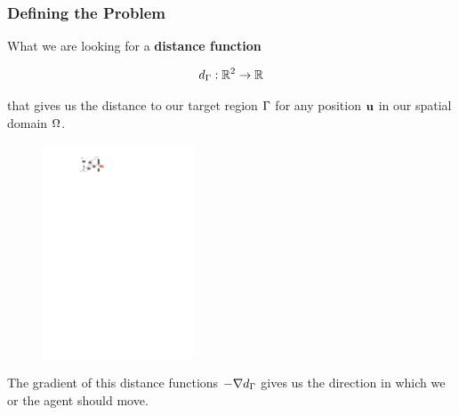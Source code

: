 \documentclass[aspectratio=169,handout]{beamer}
\begin{document}
\begin{frame}
	\frametitle{Defining the Problem}
	What we are looking for a \textbf{distance function} 
	
	$$d_{\Gamma}: \mathbb{R}^2 \rightarrow \mathbb{R}$$
	
	that gives us the distance to our target region $\Gamma$ for any position $\mathbf{u}$  in our spatial domain $\Omega$.
	\begin{figure}
		\centering
		\includegraphics[width=0.4\textwidth]{./figs/wayfinding_en.pdf}
	\end{figure}
	The gradient of this distance functions $-\nabla d_{\Gamma}$ gives us the direction in which we or the agent should move.
\end{frame}
\end{document}
